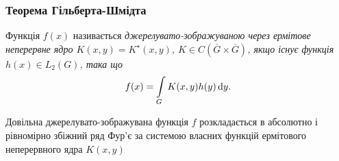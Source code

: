 \subsubsection{Теорема Гільберта-Шмідта}

\begin{definition}
    Функція $f(x)$ називається \it{джерелувато-зображуваною} через ермітове неперервне ядро $K(x, y) = K^\star (x, y)$, $K \in  C\left(\overline G \times \overline G\right)$, якщо існує функція $h(x) \in L_2(G)$, така що 
    \begin{equation}
        f(x) = \displaystyle\int\limits_G K(x, y) h(y) \mathop{}\!\mathrm{d} y.
    \end{equation}
\end{definition}

\begin{theorem}
    Довільна джерелувато-зображувана функція $f$ розкладається в абсолютно і рівномірно збіжний ряд Фур'є за системою власних функцій ермітового неперервного ядра $K(x, y)$
\end{theorem}

